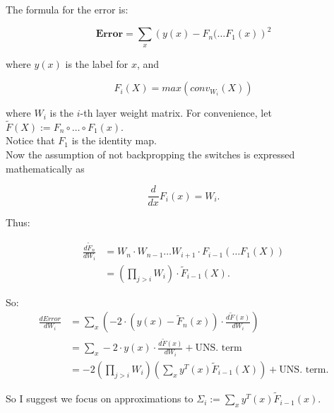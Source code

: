 \documentclass[11pt]{article}
\title{}
\author{}
\date{}
\begin{document}

\maketitle

\thispagestyle{empty}

The formula for the error is:

$$\textbf{Error} = \sum_{x} \left (y(x) - F_n( \ldots F_1(x) \right)^2$$

where $y(x)$ is the label for $x$, and 

$$F_i(X) = max(conv_{W_i}(X))$$

where $W_i$ is the $i$-th layer weight matrix.   For convenience, let $\tilde{F}(X) := F_n \circ \ldots \circ F_1 (x)$. \\

Notice that $F_1$ is the identity map. \\

Now the assumption of not backpropping the switches is expressed mathematically as

$$\frac{d}{dx}F_i(x) = W_i.$$

Thus:

\begin{eqnarray*}
\frac{d \tilde{F}_n}{d W_i} & = W_n \cdot W_{n-1} \ldots W_{i+1} \cdot F_{i-1}( \ldots F_1(X)) \\
                            & = \left( \prod_{j > i} W_i \right) \cdot \tilde{F}_{i-1}(X).
\end{eqnarray*}                 
                 
So:                        
\begin{eqnarray*}
\frac{d Error}{d W_i} & = \sum_x \left ( -2 \cdot (y(x) - \tilde{F}_n(x)) \cdot \frac{d\tilde{F}(x)}{dW_i} \right ) \\     
                      & = \sum_x -2 \cdot y(x) \cdot  \frac{d\tilde{F}(x)}{dW_i} + \text{UNS. term} \\
                      & = -2 \left(\prod_{j > i} W_i \right) \left(\sum_x y^T(x) \tilde{F}_{i-1}(X) \right) + \text{UNS. term}.
\end{eqnarray*}

So I suggest we focus on approximations to $\Sigma_{i} := \sum_x y^T(x) \tilde{F}_{i-1}(x)$.

\newpage

\footnotesize{

\linespread{0.9}

}
\end{document}
